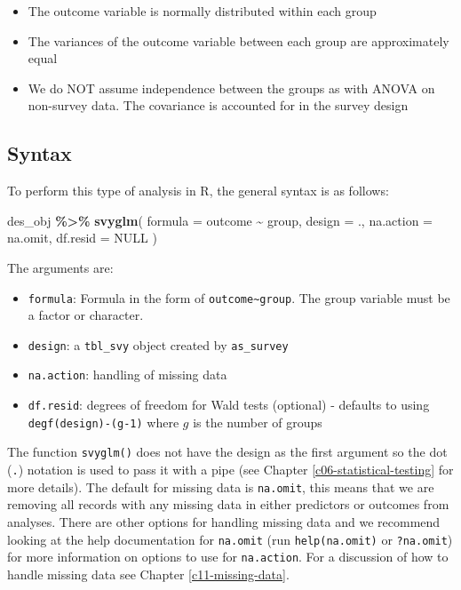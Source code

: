 \documentclass[
]{krantz}
\makeatletter
\newenvironment{Shaded}{\begin{snugshade}}{\end{snugshade}}
\newcommand{\AttributeTok}[1]{\textcolor[rgb]{0.27,0.27,0.27}{#1}}
\newcommand{\ConstantTok}[1]{\textcolor[rgb]{0.37,0.37,0.37}{#1}}
\newcommand{\FunctionTok}[1]{\textcolor[rgb]{0.27,0.27,0.27}{\textbf{#1}}}
\newcommand{\NormalTok}[1]{#1}
\newcommand{\SpecialCharTok}[1]{\textcolor[rgb]{0.43,0.43,0.43}{\textbf{#1}}}
\providecommand{\tightlist}{%
  \setlength{\itemsep}{0pt}\setlength{\parskip}{0pt}}
\newenvironment{kframe}{%
\medskip{}
\setlength{\fboxsep}{.8em}
 \def\at@end@of@kframe{}%
 \ifinner\ifhmode%
  \def\at@end@of@kframe{\end{minipage}}%
  \begin{minipage}{\columnwidth}%
 \fi\fi%
 \def\FrameCommand##1{\hskip\@totalleftmargin \hskip-\fboxsep
 \colorbox{shadecolor}{##1}\hskip-\fboxsep
     \hskip-\linewidth \hskip-\@totalleftmargin \hskip\columnwidth}%
 \MakeFramed {\advance\hsize-\width
   \@totalleftmargin\z@ \linewidth\hsize
   \@setminipage}}%
 {\par\unskip\endMakeFramed%
 \at@end@of@kframe}
\renewenvironment{Shaded}{\begin{kframe}}{\end{kframe}}
\makeatother
\begin{document}
\begin{itemize}
\tightlist
\item
  The outcome variable is normally distributed within each group
\item
  The variances of the outcome variable between each group are approximately equal
\item
  We do NOT assume independence between the groups as with ANOVA on non-survey data. The covariance is accounted for in the survey design
\end{itemize}

\hypertarget{syntax-6}{%
\subsection{Syntax}\label{syntax-6}}

To perform this type of analysis in R, the general syntax is as follows:

\begin{Shaded}
\begin{Highlighting}[]
\NormalTok{des\_obj }\SpecialCharTok{\%\textgreater{}\%}
  \FunctionTok{svyglm}\NormalTok{(}
    \AttributeTok{formula =}\NormalTok{ outcome }\SpecialCharTok{\textasciitilde{}}\NormalTok{ group,}
    \AttributeTok{design =}\NormalTok{ .,}
    \AttributeTok{na.action =}\NormalTok{ na.omit,}
    \AttributeTok{df.resid =} \ConstantTok{NULL}
\NormalTok{  )}
\end{Highlighting}
\end{Shaded}

The arguments are:

\begin{itemize}
\tightlist
\item
  \texttt{formula}: Formula in the form of \texttt{outcome\textasciitilde{}group}. The group variable must be a factor or character.
\item
  \texttt{design}: a \texttt{tbl\_svy} object created by \texttt{as\_survey}
\item
  \texttt{na.action}: handling of missing data
\item
  \texttt{df.resid}: degrees of freedom for Wald tests (optional) - defaults to using \texttt{degf(design)-(g-1)} where \(g\) is the number of groups
\end{itemize}

The function \texttt{svyglm()} does not have the design as the first argument so the dot (\texttt{.}) notation is used to pass it with a pipe (see Chapter \ref{c06-statistical-testing} for more details). The default for missing data is \texttt{na.omit}, this means that we are removing all records with any missing data in either predictors or outcomes from analyses. There are other options for handling missing data and we recommend looking at the help documentation for \texttt{na.omit} (run \texttt{help(na.omit)} or \texttt{?na.omit}) for more information on options to use for \texttt{na.action}. For a discussion of how to handle missing data see Chapter \ref{c11-missing-data}.
\end{document}
